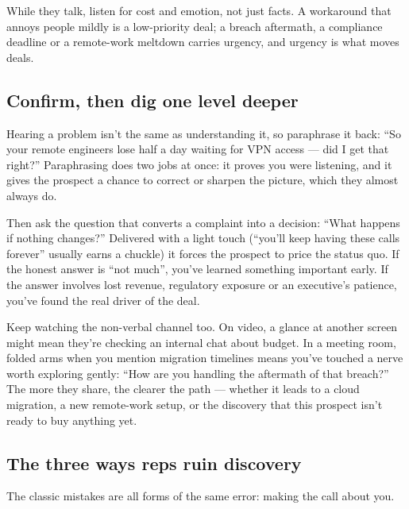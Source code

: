 While they talk, listen for cost and emotion, not just facts. A workaround that annoys people mildly is a low-priority deal; a breach aftermath, a compliance deadline or a remote-work meltdown carries urgency, and urgency is what moves deals.



\subsection{Confirm, then dig one level deeper}


Hearing a problem isn't the same as understanding it, so paraphrase it back: ``So your remote engineers lose half a day waiting for VPN access — did I get that right?'' Paraphrasing does two jobs at once: it proves you were listening, and it gives the prospect a chance to correct or sharpen the picture, which they almost always do.


Then ask the question that converts a complaint into a decision: ``What happens if nothing changes?'' Delivered with a light touch (``you'll keep having these calls forever'' usually earns a chuckle) it forces the prospect to price the status quo. If the honest answer is ``not much'', you've learned something important early. If the answer involves lost revenue, regulatory exposure or an executive's patience, you've found the real driver of the deal.


Keep watching the non-verbal channel too. On video, a glance at another screen might mean they're checking an internal chat about budget. In a meeting room, folded arms when you mention migration timelines means you've touched a nerve worth exploring gently: ``How are you handling the aftermath of that breach?'' The more they share, the clearer the path — whether it leads to a cloud migration, a new remote-work setup, or the discovery that this prospect isn't ready to buy anything yet.



\subsection{The three ways reps ruin discovery}


The classic mistakes are all forms of the same error: making the call about you.


